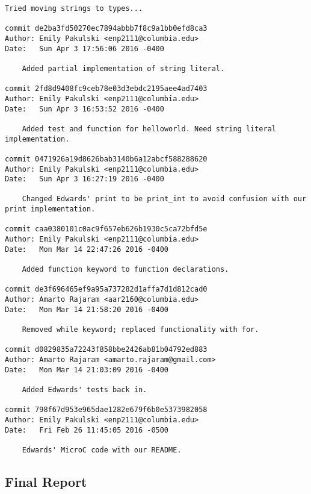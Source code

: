 \begin{lstlisting}[backgroundcolor=\color{white}]
    Tried moving strings to types...

commit de2ba3fd50270ec7894abbb7f8c9a1bb0efd8ca3
Author: Emily Pakulski <enp2111@columbia.edu>
Date:   Sun Apr 3 17:56:06 2016 -0400

    Added partial implementation of string literal.

commit 2fd8d9408fc9ceb78e03d3ebdc2195aee4ad7403
Author: Emily Pakulski <enp2111@columbia.edu>
Date:   Sun Apr 3 16:53:52 2016 -0400

    Added test and function for helloworld. Need string literal implementation.

commit 0471926a19d8626bab3140b6a12abcf588288620
Author: Emily Pakulski <enp2111@columbia.edu>
Date:   Sun Apr 3 16:27:19 2016 -0400

    Changed Edwards' print to be print_int to avoid confusion with our print implementation.

commit caa0380101c0ac9f657eb626b1930c5ca72bfd5e
Author: Emily Pakulski <enp2111@columbia.edu>
Date:   Mon Mar 14 22:47:26 2016 -0400

    Added function keyword to function declarations.

commit de3f696465ef9a95a737282d1affa7d1d812cad0
Author: Amarto Rajaram <aar2160@columbia.edu>
Date:   Mon Mar 14 21:58:20 2016 -0400

    Removed while keyword; replaced functionality with for.

commit d0829835a72243f858bbe2426ab81b04792ed883
Author: Amarto Rajaram <amarto.rajaram@gmail.com>
Date:   Mon Mar 14 21:03:09 2016 -0400

    Added Edwards' tests back in.

commit 798f67d953e965dae1282e679f6b0e5373982058
Author: Emily Pakulski <enp2111@columbia.edu>
Date:   Fri Feb 26 11:45:05 2016 -0500

    Edwards' MicroC code with our README.

    \end{lstlisting}

\subsection{Final Report}

